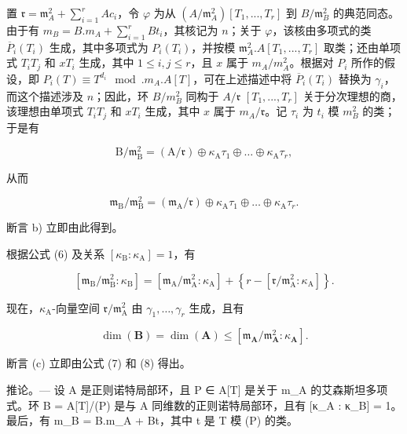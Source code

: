 置 \(\mathfrak{r} = \mathfrak{m}_{A}^{2} + \sum_{i=1}^{r} A c_i\)，令 \(\varphi\) 为从 \((A/\mathfrak{m}_{A}^{2})[T_1, ..., T_r]\) 到 \(B/\mathfrak{m}_{B}^{2}\) 的典范同态。由于有 \(m_B = B.m_A + \sum_{i=1}^{r} B t_i\)，其核记为 \(n\)；关于 \(\varphi\)，该核由多项式的类 \(\overline{P}_i(T_i)\) 生成，其中多项式为 \(P_i(T_i)\)，并按模 \(\mathfrak{m}_{A}^{2}.A[T_1, ..., T_r]\) 取类；还由单项式 \(T_i T_j\) 和 \(x T_i\) 生成，其中 \(1 \leqslant i, j \leqslant r\)，且 \(x\) 属于 \(m_A/m_A^2\)。根据对 \(P_i\) 所作的假设，即 \(P_i(T) \equiv T^{d_i} \mod. m_A.A[T]\)，可在上述描述中将 \(\overline{P}_i(T_i)\) 替换为 \(\gamma_i\)，而这个描述涉及 \(n\)；因此，环 \(B/m_B^2\) 同构于 \(A/\mathfrak{r}\) \([T_{1}, ..., T_{r}]\) 关于分次理想的商，该理想由单项式 \(T_{i}T_{j}\) 和 \(xT_{i}\) 生成，其中 \(x\) 属于 \(m_A/\mathfrak{r}\)。记 \(\tau_{i}\) 为 \(t_{i}\) 模 \(m_{B}^{2}\) 的类；于是有

\[
\mathrm{B} / \mathfrak {m} _ {\mathrm{B}} ^ {2} = (\mathrm{A} / \mathfrak {r}) \oplus \kappa_ {\mathrm{A}} \tau_ {1} \oplus \dots \oplus \kappa_ {\mathrm{A}} \tau_ {r},\tag{5}
\]

从而

\[
\mathfrak {m} _ {\mathrm{B}} / \mathfrak {m} _ {\mathrm{B}} ^ {2} = (\mathfrak {m} _ {\mathrm{A}} / \mathfrak {r}) \oplus \kappa_ {\mathrm{A}} \tau_ {1} \oplus \dots \oplus \kappa_ {\mathrm{A}} \tau_ {r}.\tag{6}
\]

断言 b) 立即由此得到。

根据公式 (6) 及关系 \([\kappa_{\mathrm{B}}:\kappa_{\mathrm{A}}] = 1\)，有

\[
\left[ \mathfrak {m} _ {\mathrm{B}} / \mathfrak {m} _ {\mathrm{B}} ^ {2}: \kappa_ {\mathrm{B}} \right] = \left[ \mathfrak {m} _ {\mathrm{A}} / \mathfrak {m} _ {\mathrm{A}} ^ {2}: \kappa_ {\mathrm{A}} \right] + \left\{r - \left[ \mathfrak {r} / \mathfrak {m} _ {\mathrm{A}} ^ {2}: \kappa_ {\mathrm{A}} \right] \right\}.\tag{7}
\]

现在，\(\kappa_{\mathrm{A}}\)-向量空间 \(\mathfrak{r}/\mathfrak{m}_{\mathrm{A}}^{2}\) 由 \(\gamma_{1}, \ldots, \gamma_{r}\) 生成，且有

\[
\dim (\mathbf {B}) = \dim (\mathbf {A}) \leqslant [ \mathfrak {m} _ {\mathbf {A}} / \mathfrak {m} _ {\mathbf {A}} ^ {2}: \kappa_ {\mathbf {A}} ].\tag{8}
\]

断言 (c) 立即由公式 (7) 和 (8) 得出。

推论。--- 设 A 是正则诺特局部环，且 P ∈ A{[}T{]} 是关于 m\_A 的艾森斯坦多项式。环 B = A{[}T{]}/(P) 是与 A 同维数的正则诺特局部环，且有 {[}κ\_A : κ\_B{]} = 1。最后，有 m\_B = B.m\_A + Bt，其中 t 是 T 模 (P) 的类。

